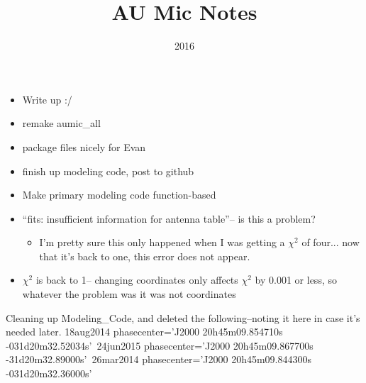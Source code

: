 \documentclass[a4paper]{tufte-handout}
\title{AU Mic Notes}
\date{2016}
\begin{document}
\maketitle


\begin{tasks}
    \begin{itemize}
      \item Write up :/
      \item remake aumic\_all
      \item package files nicely for Evan
      \item finish up modeling code, post to github
    \end{itemize}
\end{tasks}


\begin{maybe}
    \begin{itemize}
      \item Make primary modeling code function-based
    \end{itemize}
\end{maybe}


\begin{mer}
    \begin{itemize}
      \item ``fits: insufficient information for antenna table''-- is this a problem?
      \begin{itemize}
        \item I'm pretty sure this only happened when I was getting a $\chi^2$ of four... now that it's back to one, this error does not appear.
      \end{itemize}
      \item $\chi^2$ is back to 1-- changing coordinates only affects $\chi^2$ by 0.001 or less, so whatever the problem was it was not coordinates
    \end{itemize}

\end{mer}


Cleaning up Modeling\_Code, and deleted the following--noting it here in case it's needed later.
\noindent 18aug2014 phasecenter='J2000 20h45m09.854710s -031d20m32.52034s'\
24jun2015 phasecenter='J2000 20h45m09.867700s -31d20m32.89000s'\
26mar2014 phasecenter='J2000 20h45m09.844300s -031d20m32.36000s'\
\end{document}
